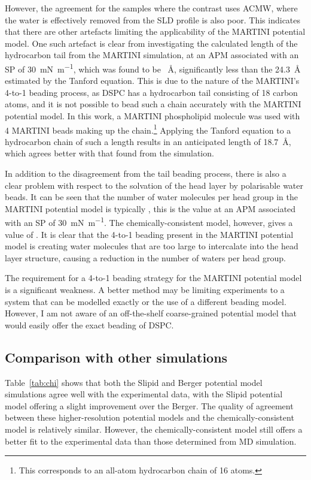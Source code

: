 However, the agreement for the samples where the contrast uses ACMW, where the water is effectively removed from the SLD profile is also poor.
This indicates that there are other artefacts limiting the applicability of the MARTINI potential model.
One such artefact is clear from investigating the calculated length of the hydrocarbon tail from the MARTINI simulation, at an APM associated with an SP of \SI{30}{\milli\newton\per\meter}, which was found to be ~\si{\angstrom}, significantly less than the \SI{24.3}{\angstrom} estimated by the Tanford equation.\autocite{tanford_hydrophobic_1980}
This is due to the nature of the MARTINI's 4-to-1 beading process, as DSPC has a hydrocarbon tail consisting of 18 carbon atoms, and it is not possible to bead such a chain accurately with the MARTINI potential model.
In this work, a MARTINI phospholipid molecule was used with 4 MARTINI beads making up the chain.\footnote{This corresponds to an all-atom hydrocarbon chain of 16 atoms.}
Applying the Tanford equation to a hydrocarbon chain of such a length results in an anticipated length of \SI{18.7}{\angstrom}, which agrees better with that found from the simulation.

In addition to the disagreement from the tail beading process, there is also a clear problem with respect to the solvation of the head layer by polarisable water beads.
It can be seen that the number of water molecules per head group in the MARTINI potential model is typically , this is the value at an APM associated with an SP of \SI{30}{\milli\newton\per\meter}.
The chemically-consistent model, however, gives a value of .
It is clear that the 4-to-1 beading present in the MARTINI potential model is creating water molecules that are too large to intercalate into the head layer structure, causing a reduction in the number of waters per head group.

The requirement for a 4-to-1 beading strategy for the MARTINI potential model is a significant weakness.
A better method may be limiting experiments to a system that can be modelled exactly or the use of a different beading model.
However, I am not aware of an off-the-shelf coarse-grained potential model that would easily offer the exact beading of DSPC.

\subsection{Comparison with other simulations}
Table~\ref{tab:chi} shows that both the Slipid and Berger potential model simulations agree well with the experimental data, with the Slipid potential model offering a slight improvement over the Berger.
The quality of agreement between these higher-resolution potential models and the chemically-consistent model is relatively similar.
However, the chemically-consistent model still offers a better fit to the experimental data than those determined from MD simulation.

